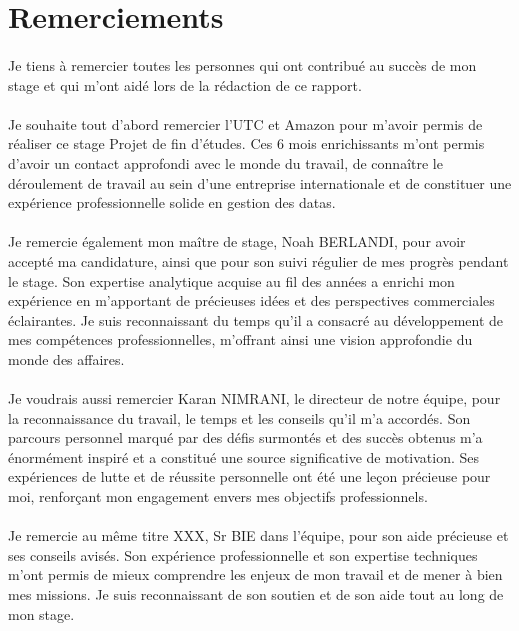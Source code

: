 \section*{Remerciements}
\paragraph{}
\vspace{-2em}  %
Je tiens à remercier toutes les personnes qui ont contribué au succès de mon stage et qui
m'ont aidé lors de la rédaction de ce rapport.
\vspace{-2em}  %
\paragraph{}
Je souhaite tout d'abord remercier l'UTC et Amazon pour m'avoir permis de
réaliser ce stage Projet de fin d'études. Ces 6 mois enrichissants m'ont permis
d'avoir un contact approfondi avec le monde du travail, de connaître le déroulement de travail au sein d'une entreprise internationale et de constituer une
expérience professionnelle solide en gestion des datas.
\vspace{-2em}  %
\paragraph{}
Je remercie également mon maître de stage, Noah BERLANDI, pour avoir accepté ma candidature, ainsi que pour son suivi régulier de mes progrès pendant le stage. 
Son expertise analytique acquise au fil des années a enrichi mon expérience en m'apportant de précieuses idées et des perspectives commerciales éclairantes. Je suis reconnaissant du temps qu'il a consacré au développement de mes compétences professionnelles, m'offrant ainsi une vision approfondie du monde des affaires.
\vspace{-2em}  %
\paragraph{}
Je voudrais aussi remercier Karan NIMRANI, le directeur de notre équipe, pour la reconnaissance du travail, le temps et les conseils qu'il m'a accordés. Son parcours personnel marqué par des défis surmontés et des succès obtenus m'a énormément inspiré et a constitué une source significative de motivation. Ses expériences de lutte et de réussite personnelle ont été une leçon précieuse pour moi, renforçant mon engagement envers mes objectifs professionnels.
\vspace{-2em}  %
\paragraph{}
Je remercie au même titre XXX, Sr BIE dans l'équipe, pour son aide précieuse et ses conseils avisés. Son expérience professionnelle et son expertise techniques m'ont permis de mieux comprendre les enjeux de mon travail et de mener à bien mes missions. 
Je suis reconnaissant de son soutien et de son aide tout au long de mon stage.